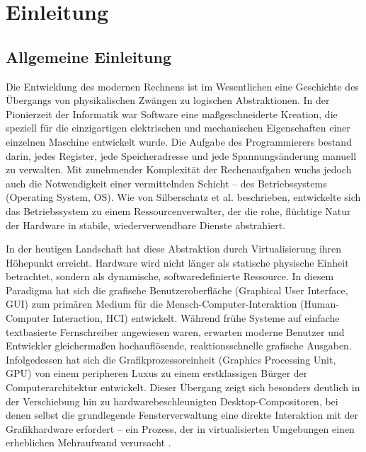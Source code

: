 \chapter{Einleitung}

\section{Allgemeine Einleitung}
Die Entwicklung des modernen Rechnens ist im Wesentlichen eine Geschichte des Übergangs von physikalischen Zwängen zu logischen Abstraktionen. In der Pionierzeit der Informatik war Software eine maßgeschneiderte Kreation, die speziell für die einzigartigen elektrischen und mechanischen Eigenschaften einer einzelnen Maschine entwickelt wurde. Die Aufgabe des Programmierers bestand darin, jedes Register, jede Speicheradresse und jede Spannungsänderung manuell zu verwalten. Mit zunehmender Komplexität der Rechenaufgaben wuchs jedoch auch die Notwendigkeit einer vermittelnden Schicht – des Betriebssystems (Operating System, OS). Wie von Silberschatz et al. \cite{Silberschatz2021} beschrieben, entwickelte sich das Betriebssystem zu einem Ressourcenverwalter, der die rohe, flüchtige Natur der Hardware in stabile, wiederverwendbare Dienste abstrahiert.

In der heutigen Landschaft hat diese Abstraktion durch Virtualisierung ihren Höhepunkt erreicht. Hardware wird nicht länger als statische physische Einheit betrachtet, sondern als dynamische, softwaredefinierte Ressource. In diesem Paradigma hat sich die grafische Benutzeroberfläche (Graphical User Interface, GUI) zum primären Medium für die Mensch-Computer-Interaktion (Human-Computer Interaction, HCI) entwickelt. Während frühe Systeme auf einfache textbasierte Fernschreiber angewiesen waren, erwarten moderne Benutzer und Entwickler gleichermaßen hochauflösende, reaktionsschnelle grafische Ausgaben. Infolgedessen hat sich die Grafikprozessoreinheit (Graphics Processing Unit, GPU) von einem peripheren Luxus zu einem erstklassigen Bürger der Computerarchitektur entwickelt. Dieser Übergang zeigt sich besonders deutlich in der Verschiebung hin zu hardwarebeschleunigten Desktop-Compositoren, bei denen selbst die grundlegende Fensterverwaltung eine direkte Interaktion mit der Grafikhardware erfordert – ein Prozess, der in virtualisierten Umgebungen einen erheblichen Mehraufwand verursacht \cite{Belkhiri2024}.

